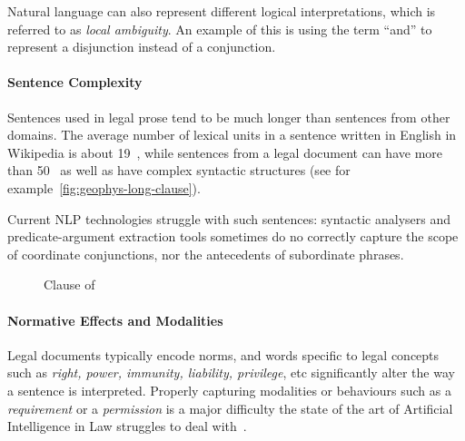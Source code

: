 Natural language can also represent different logical interpretations, which is referred to as \emph{local ambiguity}.
An example of this is using the term ``and'' to represent a disjunction instead of a conjunction.

\paragraph{Sentence Complexity}

Sentences used in legal prose tend to be much longer than sentences from other domains.
The average number of lexical units in a sentence written in English in Wikipedia is about 19~\cite{wiki19words}, while sentences from a legal document can have more than 50~\cite{ferraroLegalNLPSSurvey} as well as have complex syntactic structures (see for example~\autoref{fig:geophys-long-clause}).

Current NLP technologies struggle with such sentences: syntactic analysers and predicate-argument extraction tools sometimes do no correctly capture the scope of coordinate conjunctions, nor the antecedents of subordinate phrases.

\begin{figure}[h]
    \centering
    \caption{Clause  of~~\cite{seismicDataLicence}}
    \label{fig:geophys-long-clause}
\end{figure}

\paragraph{Normative Effects and Modalities}

Legal documents typically encode norms, and words specific to legal concepts such as \emph{right, power, immunity, liability, privilege}, etc significantly alter the way a sentence is interpreted.
Properly capturing modalities or behaviours such as a \emph{requirement} or a \emph{permission} is a major difficulty the state of the art of Artificial Intelligence in Law struggles to deal with~\cite{ferraroLegalNLPSSurvey}.


